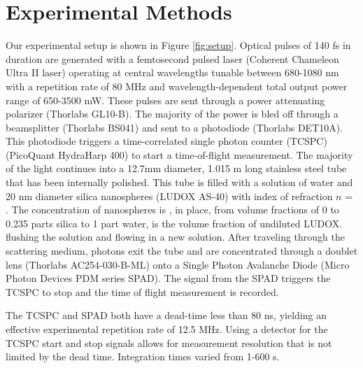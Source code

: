 \section{Experimental Methods}\label{sec:exp_meth}

Our experimental setup is shown in Figure \ref{fig:setup}. Optical pulses of 140 fs in duration are generated with a femtosecond pulsed laser (Coherent Chameleon Ultra II laser) operating at central wavelengths tunable between 680-1080 nm with a repetition rate of 80 MHz and wavelength-dependent total output power range of 650-3500 mW. These pulses are sent through a power attenuating polarizer (Thorlabs GL10-B).  The majority of the power is bled off through a beamsplitter (Thorlabs BS041) and sent to a photodiode (Thorlabs DET10A).  This photodiode triggers a time-correlated single photon counter (TCSPC) (PicoQuant HydraHarp 400) to start a time-of-flight measurement.  The majority of the light continues into a 12.7mm diameter, 1.015 m long stainless steel tube that has been internally polished.  This tube is filled with a solution of water and 20 nm diameter silica nanospheres (LUDOX AS-40) with index of refraction $n$ = .  The concentration of nanospheres is , in place, from volume fractions of 0 to 0.235 parts silica to 1 part water,  is the volume fraction of undiluted LUDOX.  flushing the solution and flowing in a new solution.  After traveling through the scattering medium, photons exit the tube and are concentrated through a doublet lens (Thorlabs AC254-030-B-ML) onto a Single Photon Avalanche Diode (Micro Photon Devices PDM series SPAD).  The signal from the SPAD triggers the TCSPC to stop and the time of flight measurement is recorded. 

The  TCSPC and SPAD both have a dead-time less than 80 ns, yielding an effective experimental repetition rate of 12.5 MHz. Using a detector for the TCSPC start and stop signals allows for measurement resolution that is not limited by the dead time. Integration times varied from 1-600 s.


